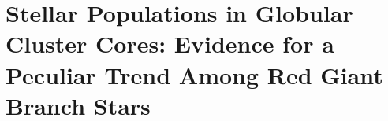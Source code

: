 \pagestyle{fancy}
\headheight 20pt
\chead{}
\lfoot{}
\cfoot{\thepage}
\rfoot{}
\renewcommand{\headrulewidth}{0.1pt}
\renewcommand{\footrulewidth}{0.1pt}
%
%
%

%
%
%
%




\chapter{Stellar
  Populations in Globular Cluster Cores:  Evidence for a Peculiar
  Trend Among Red Giant Branch Stars} \label{chapter3}

